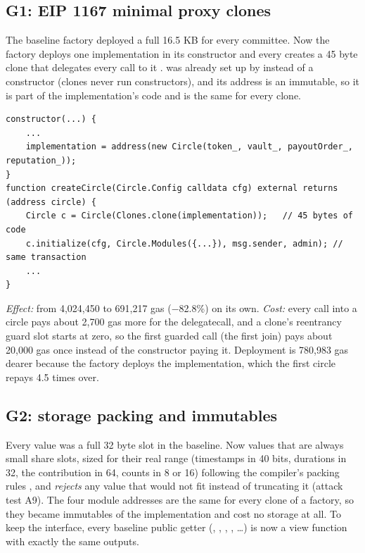 \subsection{G1: EIP 1167 minimal proxy clones}
The baseline factory deployed a full 16.5 KB  for every committee. Now the factory deploys
one implementation in its constructor and every  creates a 45 byte clone that
delegates every call to it \cite{eip1167}.  was already set up by  instead of
a constructor (clones never run constructors), and its  address is an immutable, so it is
part of the implementation's code and is the same for every clone.

\begin{lstlisting}[language=Solidity]
constructor(...) {
    ...
    implementation = address(new Circle(token_, vault_, payoutOrder_, reputation_));
}
function createCircle(Circle.Config calldata cfg) external returns (address circle) {
    Circle c = Circle(Clones.clone(implementation));   // 45 bytes of code
    c.initialize(cfg, Circle.Modules({...}), msg.sender, admin); // same transaction
    ...
}
\end{lstlisting}

\emph{Effect:}  from 4,024,450 to 691,217 gas ($-$82.8\%) on its own.
\emph{Cost:} every call into a circle pays about 2,700 gas more for the delegatecall, and a clone's
reentrancy guard slot starts at zero, so the first guarded call (the first join) pays about 20,000
gas once instead of the constructor paying it. Deployment is 780,983 gas dearer because the factory
deploys the implementation, which the first circle repays 4.5 times over.

\subsection{G2: storage packing and immutables}
Every value was a full 32 byte slot in the baseline. Now values that are always small share slots,
sized for their real range (timestamps in 40 bits, durations in 32, the contribution in 64, counts in 8
or 16) following the compiler's packing rules \cite{soliditylayout}, and  \emph{rejects} any value that would not fit instead of truncating it
(attack test A9). The four module addresses are the same for every clone of a factory, so they became
immutables of the implementation and cost no storage at all. To keep the interface, every baseline
public getter (, , , , \dots) is now a view
function with exactly the same outputs.

